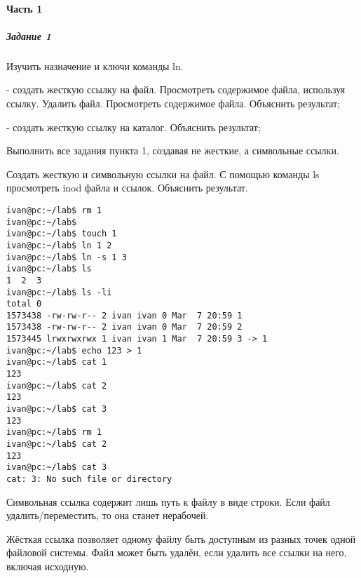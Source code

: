 \paragraph{Часть 1}
\subparagraph{Задание 1}
Изучить назначение и ключи команды ln.

- создать жесткую ссылку на файл. Просмотреть содержимое файла, используя
ссылку. Удалить файл. Просмотреть содержимое файла. Объяснить результат;

- создать жесткую ссылку на каталог. Объяснить результат;

Выполнить все задания пункта 1, создавая не жесткие, а символьные ссылки.

Создать жесткую и символьную ссылки на файл. С помощью команды ls
просмотреть inod файла и ссылок. Объяснить результат.

\begin{verbatim}
ivan@pc:~/lab$ rm 1
ivan@pc:~/lab$ 
ivan@pc:~/lab$ touch 1
ivan@pc:~/lab$ ln 1 2
ivan@pc:~/lab$ ln -s 1 3
ivan@pc:~/lab$ ls
1  2  3
ivan@pc:~/lab$ ls -li
total 0
1573438 -rw-rw-r-- 2 ivan ivan 0 Mar  7 20:59 1
1573438 -rw-rw-r-- 2 ivan ivan 0 Mar  7 20:59 2
1573445 lrwxrwxrwx 1 ivan ivan 1 Mar  7 20:59 3 -> 1
ivan@pc:~/lab$ echo 123 > 1
ivan@pc:~/lab$ cat 1
123
ivan@pc:~/lab$ cat 2
123
ivan@pc:~/lab$ cat 3
123
ivan@pc:~/lab$ rm 1
ivan@pc:~/lab$ cat 2
123
ivan@pc:~/lab$ cat 3
cat: 3: No such file or directory
\end{verbatim}

Символьная ссылка содержит лишь путь к файлу в виде строки. Если файл удалить/переместить,
то она станет нерабочей.

Жёсткая ссылка позволяет одному файлу быть доступным из разных точек одной файловой
системы. Файл может быть удалён, если удалить все ссылки на него, включая исходную. 